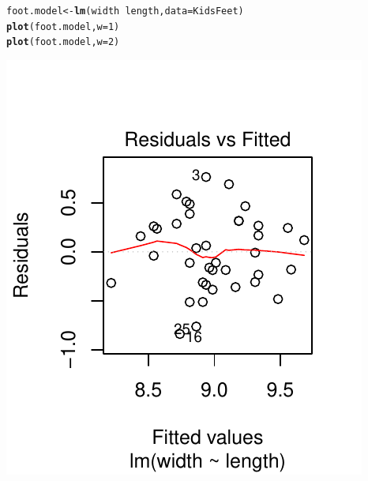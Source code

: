 \documentclass[twoside]{book}\usepackage[]{graphicx}\usepackage[]{xcolor}
\makeatletter
\def\maxwidth{ %
  \ifdim\Gin@nat@width>\linewidth
    \linewidth
  \else
    \Gin@nat@width
  \fi
}
\newcommand{\hlnum}[1]{\textcolor[rgb]{0.686,0.059,0.569}{#1}}%
\newcommand{\hlopt}[1]{\textcolor[rgb]{0,0,0}{#1}}%
\newcommand{\hlstd}[1]{\textcolor[rgb]{0.345,0.345,0.345}{#1}}%
\newcommand{\hlkwb}[1]{\textcolor[rgb]{0.69,0.353,0.396}{#1}}%
\newcommand{\hlkwc}[1]{\textcolor[rgb]{0.333,0.667,0.333}{#1}}%
\newcommand{\hlkwd}[1]{\textcolor[rgb]{0.737,0.353,0.396}{\textbf{#1}}}%
\newenvironment{kframe}{%
 \def\at@end@of@kframe{}%
 \ifinner\ifhmode%
  \def\at@end@of@kframe{\end{minipage}}%
  \begin{minipage}{\columnwidth}%
 \fi\fi%
 \def\FrameCommand##1{\hskip\@totalleftmargin \hskip-\fboxsep
 \colorbox{shadecolor}{##1}\hskip-\fboxsep
     \hskip-\linewidth \hskip-\@totalleftmargin \hskip\columnwidth}%
 \MakeFramed {\advance\hsize-\width
   \@totalleftmargin\z@ \linewidth\hsize
   \@setminipage}}%
 {\par\unskip\endMakeFramed%
 \at@end@of@kframe}
\newenvironment{knitrout}{}{} %
\makeatother
\begin{document}
\begin{solution}
\begin{knitrout}
\color{fgcolor}\begin{kframe}
\begin{alltt}
\hlstd{foot.model} \hlkwb{<-} \hlkwd{lm}\hlstd{(width} \hlopt{~} \hlstd{length,} \hlkwc{data} \hlstd{= KidsFeet)}
\hlkwd{plot}\hlstd{(foot.model,} \hlkwc{w} \hlstd{=} \hlnum{1}\hlstd{)}
\hlkwd{plot}\hlstd{(foot.model,} \hlkwc{w} \hlstd{=} \hlnum{2}\hlstd{)}
\end{alltt}
\end{kframe}

{\centering \includegraphics[width=\maxwidth]{figures/fig-unnamed-chunk-185-1} 
}
\end{knitrout}
\end{solution}
\end{document}
